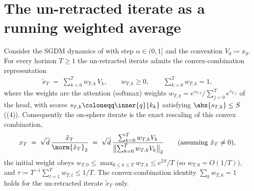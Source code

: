 \section{The un-retracted iterate as a running weighted average}
\label{sec:running_average}

\begin{lemma}
\label{lem:running_average}
Consider the SGDM dynamics of  with step
$\alpha\in(0,1]$ and the convention $V_0\coloneqq x_0$. For every horizon
$T\ge1$ the un-retracted iterate admits the convex-combination
representation
\begin{align}\label{eq:running_average}
   \tilde x_T \;=\; \sum_{k=0}^{T} w_{T,k}\, V_k,
   \qquad
   w_{T,k}\ge0,
   \qquad
   \sum_{k=0}^{T} w_{T,k} = 1,
\end{align}
where the weights are the attention (softmax) weights
$w_{T,k}=e^{s_{T,k}}/\sum_{j=0}^{T}e^{s_{T,j}}$ of the head, with scores
$s_{T,k}\coloneqq\inner{q}{k_k}$ satisfying $\abs{s_{T,k}}\le S$
((4)). Consequently the on-sphere iterate is
the exact rescaling of this convex combination,
\begin{align}\label{eq:onsphere_direction}
   x_T \;=\; \sqrt d\,\frac{\tilde x_T}{\norm{\tilde x_T}_2}
   \;=\; \sqrt d\,\frac{\sum_{k=0}^{T}w_{T,k}V_k}{\bigl\|\sum_{k=0}^{T}w_{T,k}V_k\bigr\|_2}
   \qquad (\text{assuming }\tilde x_T\neq0),
\end{align}
the initial weight obeys $w_{T,0}\le\max_{0\le k\le T}w_{T,k}\le e^{2S}/T$
(so $w_{T,0}=O(1/T)$), and $\tau\coloneqq T^{-1}\sum_{t=1}^{T}w_{T,t}\le1/T$.
The convex-combination identity $\sum_k w_{T,k}=1$ holds for the
un-retracted iterate $\tilde x_T$ only.
\end{lemma}

